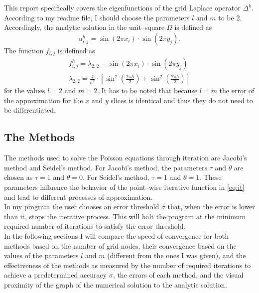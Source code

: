 \documentclass[a4paper,12pt,reqno]{article}
\begin{document}
This report specifically covers the eigenfunctions of the grid Laplace operator
$\Delta^h$. According to my readme file, I should choose the parameters $l$ and
$m$ to be 2. Accordingly, the analytic solution in the unit--square $\Omega$ is
defined as 
\begin{equation}\label{eq:an}
    u^h_{i,j} = \sin(2\pi x_i) \cdot \sin(2\pi y_j).
\end{equation}
The function $f_{i,j}$ is defined as
\begin{equation}\nonumber
    \begin{gathered}
        f^h_{i,j} = \lambda_{2,2} - \sin(2\pi x_i) \cdot \sin(2\pi y_j) \\
        \lambda_{2,2} = \frac{4}{h^2} 
            \cdot \left[ \sin^2\left(\frac{2\pi h}{2}\right) 
            + \sin^2\left(\frac{2\pi h}{2}\right) \right]
    \end{gathered}
\end{equation}
for the values $l=2$ and $m=2$. It has to be noted that because $l=m$ the error
of the approximation for the $x$ and $y$ slices is identical and thus they do
not need to be differentiated.

\subsection{The Methods}

The methods used to solve the Poisson equations through iteration are Jacobi's 
method and Seidel's method. For Jacobi's method, the parameters $\tau$ and
$\theta$ are chosen as $\tau = 1$ and $\theta = 0$.
For Seidel's method, $\tau = 1$ and $\theta = 1$. These parameters influence 
the behavior of the point--wise iterative function in \eqref{eq:it} and lead to 
different processes of approximation.\\
In my program the user chooses an error threshold $\sigma$ that, when the error 
is lower than it, stops the iterative process. This will halt the program at 
the minimum required number of iterations to satisfy the error threshold.\\
In the following sections I will compare the speed of convergence for both
methods based on the number of grid nodes, their convergence based on the
values of the parameters $l$ and $m$ (different from the ones I was given), and 
the effectiveness of the methods as measured by the number of required 
iterations to achieve a predetermined accuracy $\sigma$, the errors of each 
method, and the visual proximity of the graph of the numerical solution to the
analytic solution.
\end{document}
